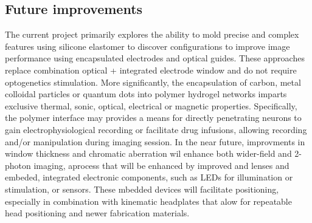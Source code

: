 \subsection{Future improvements}\label{sec:future-improvements}
The current project primarily explores the ability to mold precise and complex features using silicone elastomer to discover configurations to improve image performance using encapsulated electrodes and optical guides.
These approaches replace combination optical + integrated electrode window and do not require optogenetics stimulation.
More significantly, the encapsulation of carbon, metal colloidal particles or quantum dots into polymer hydrogel networks imparts exclusive thermal, sonic, optical, electrical or magnetic properties.
Specifically, the polymer interface may provides a means for directly penetrating neurons to gain electrophysiological recording or facilitate drug infusions, allowing recording and/or manipulation during imaging session.
In the near future, improvments in window thickness and chromatic aberration wil enhance both wider-field and 2-photon imaging, aprocess that will be enhanced by improved and lenses and embeded, integrated electronic components, such as LEDs for illumination or stimulation, or sensors.
These mbedded devices will facilitate positioning, especially in combination with kinematic headplates that alow for repeatable head positioning and newer fabrication materials.


% 

\cleardoublepage{}

